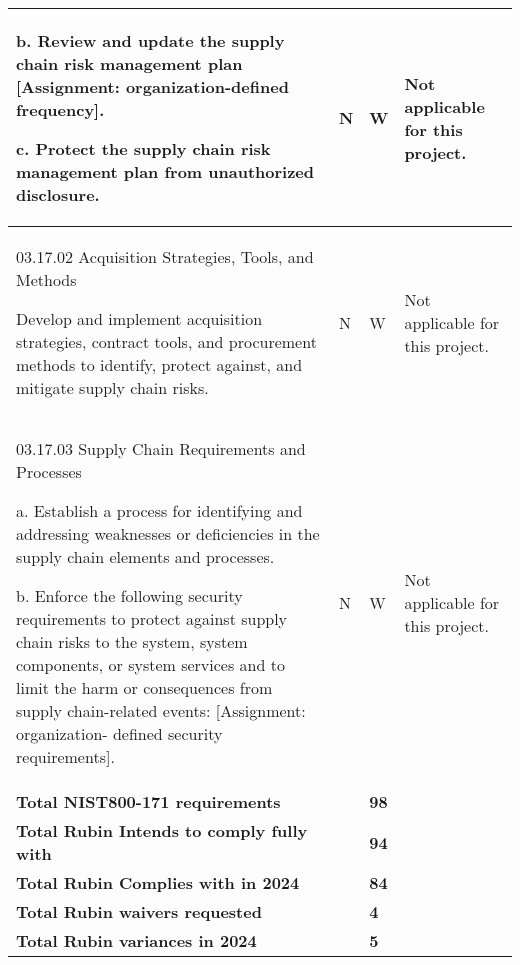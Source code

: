 \begin{longtable} {|p{}|p{}|p{}|p{} |}
{b. Review and update the supply chain risk management plan [Assignment: organization-defined frequency].

c. Protect the supply chain risk management plan from unauthorized disclosure.}&{N}&{W}&{Not applicable for this project.} \\ \hline
{03.17.02 Acquisition Strategies, Tools, and Methods

Develop and implement acquisition strategies, contract tools, and procurement methods to identify, protect against, and mitigate supply chain risks.  }&{N}&{W}&{Not applicable for this project.} \\ \hline
{03.17.03 Supply Chain Requirements and Processes

a. Establish a process for identifying and addressing weaknesses or deficiencies in the supply chain elements and processes.

b. Enforce the following security requirements to protect against supply chain risks to the system, system components, or system services and to limit the harm or consequences from supply chain-related events: [Assignment: organization- defined security requirements].}&{N}&{W}&{Not applicable for this project.} \\ \hline
\textbf{Total NIST800-171 requirements}&\textbf{}&\textbf{98}& \\ \hline
\textbf{Total Rubin Intends to comply fully with }&\textbf{}&\textbf{94}& \\ \hline
\textbf{Total Rubin Complies with in 2024}&\textbf{}&\textbf{84}& \\ \hline
\textbf{Total Rubin waivers requested }&\textbf{}&\textbf{4}& \\ \hline
\textbf{Total Rubin variances in 2024}&\textbf{}&\textbf{5}& \\ \hline
\end{longtable} \normalsize
